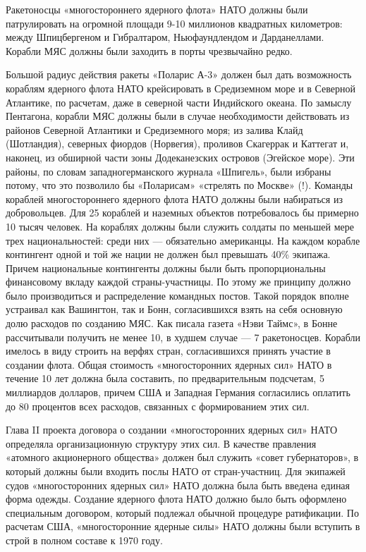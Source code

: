 \documentclass[12pt, a4paper, openany]{book}
\begin{document}
	
	
	Ракетоносцы «многостороннего ядерного флота» НАТО должны были патрулировать на огромной площади 9-10 миллионов квадратных километров: между Шпицбергеном и Гибралтаром, Ньюфаундлендом и Дарданеллами. Корабли МЯС должны были заходить в порты чрезвычайно редко.
	
	Большой радиус действия ракеты «Поларис А-3» должен был дать возможность кораблям ядерного флота НАТО крейсировать в Средиземном море и в Северной Атлантике, по расчетам, даже в северной части Индийского океана. По замыслу Пентагона, корабли МЯС должны были в случае необходимости действовать из районов Северной Атлантики и Средиземного моря; из залива Клайд (Шотландия), северных фиордов (Норвегия), проливов Скагеррак и Каттегат и, наконец, из обширной части зоны Додеканезских островов (Эгейское море). Эти районы, по словам западногерманского журнала «Шпигель», были избраны потому, что это позволило бы «Поларисам» «стрелять по Москве» (!). Команды кораблей многостороннего ядерного флота НАТО должны были набираться из добровольцев. Для 25 кораблей и наземных объектов потребовалось бы примерно 10 тысяч человек. На кораблях должны были служить солдаты по меньшей мере трех национальностей: среди них — обязательно американцы. На каждом корабле контингент одной и той же нации не должен был превышать 40\% экипажа. Причем национальные контингенты должны были быть пропорциональны финансовому вкладу каждой страны-участницы. По этому же принципу должно было производиться и распределение командных постов. Такой порядок вполне устраивал как Вашингтон, так и Бонн, согласившихся взять на себя основную долю расходов по созданию МЯС. Как писала газета «Нэви Таймс», в Бонне рассчитывали получить не менее 10, в худшем случае — 7 ракетоносцев. Корабли имелось в виду строить на верфях стран, согласившихся принять участие в создании флота. Общая стоимость «многосторонних ядерных сил» НАТО в течение 10 лет должна была составить, по предварительным подсчетам, 5 миллиардов долларов, причем США и Западная Германия согласились оплатить до 80 процентов всех расходов, связанных с формированием этих сил.
	
	Глава II проекта договора о создании «многосторонних ядерных сил» НАТО определяла организационную структуру этих сил. В качестве правления «атомного акционерного общества» должен был служить «совет губернаторов», в который должны были входить послы НАТО от стран-участниц. Для экипажей судов «многосторонних ядерных сил» НАТО должна была быть введена единая форма одежды. Создание ядерного флота НАТО должно было быть оформлено специальным договором, который подлежал обычной процедуре ратификации. По расчетам США, «многосторонние ядерные силы» НАТО должны были вступить в строй в полном составе к 1970 году.
	
\end{document}
